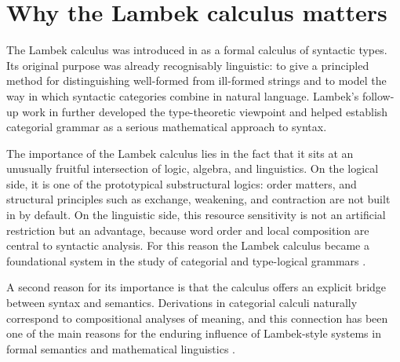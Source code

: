\section{Why the Lambek calculus matters}
The Lambek calculus was introduced in \citet{Lambek1958} as a formal calculus of syntactic
types. Its original purpose was already recognisably linguistic: to give a principled method for
distinguishing well-formed from ill-formed strings and to model the way in which syntactic
categories combine in natural language. Lambek's follow-up work in \citet{Lambek1961}
further developed the type-theoretic viewpoint and helped establish categorial grammar as a
serious mathematical approach to syntax.

The importance of the Lambek calculus lies in the fact that it sits at an unusually fruitful
intersection of logic, algebra, and linguistics. On the logical side, it is one of the prototypical
substructural logics: order matters, and structural principles such as exchange, weakening, and
contraction are not built in by default. On the linguistic side, this resource sensitivity is not an
artificial restriction but an advantage, because word order and local composition are central to
syntactic analysis. For this reason the Lambek calculus became a foundational system in the
study of categorial and type-logical grammars \citep{vanBenthem1988,Moortgat1995Multimodal,morrill1996generalising}.

A second reason for its importance is that the calculus offers an explicit bridge between syntax
and semantics. Derivations in categorial calculi naturally correspond to compositional analyses of
meaning, and this connection has been one of the main reasons for the enduring influence of
Lambek-style systems in formal semantics and mathematical linguistics \citep{vanBenthem1988,Steedman2000}.


